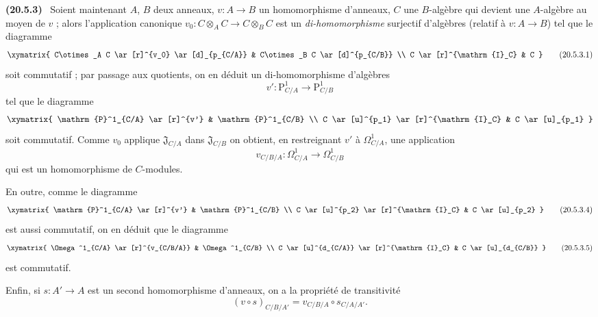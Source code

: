 \documentclass[10pt,oneside]{book}
\makeatletter
\newcommand{\setmanualcurrentlabel}[1]{\def\@currentlabel{#1}}
\newcommand{\oldpage}[2][]{%
  \setcounter{footnote}{0}%
  \marginpar{\scriptsize\textbf{#1}~|~#2}\ignorespaces}
\newenvironment{env}[1][]{\setmanualcurrentlabel{#1}\par\medskip\noindent\textbf{(#1)}\ }{\par}
\makeatother
\begin{document}
\begin{env}[20.5.3]
\label{0.20.5.3-fr}
Soient maintenant $A$, $B$ deux anneaux, $v:A\to B$ un homomorphisme
d'anneaux, $C$ une $B$-algèbre qui devient une $A$-algèbre au moyen de $v$ ;
alors l'application canonique $v_0:C\otimes_A C\to C\otimes_B C$ est un
\emph{di-homomorphisme} surjectif d'algèbres (relatif à $v:A\to B$) tel que
le diagramme
\[
\xymatrix{
  C\otimes_A C \ar[r]^{v_0} \ar[d]_{p_{C/A}} &
  C\otimes_B C \ar[d]^{p_{C/B}} \\
  C \ar[r]^{\mathrm{I}_C} & C
}
\tag{20.5.3.1}
\label{0.20.5.3.1-fr}
\]
soit commutatif ; par passage aux quotients, on en déduit un
di-homomorphisme d'algèbres
\begin{equation}
\tag{20.5.3.2}
\label{0.20.5.3.2-fr}
  v':\mathrm{P}^1_{C/A}\to\mathrm{P}^1_{C/B}
\end{equation}
tel que le diagramme
\[
\xymatrix{
  \mathrm{P}^1_{C/A} \ar[r]^{v'} & \mathrm{P}^1_{C/B} \\
  C \ar[u]^{p_1} \ar[r]^{\mathrm{I}_C} & C \ar[u]_{p_1}
}
\]
soit commutatif. Comme $v_0$ applique $\mathfrak{J}_{C/A}$ dans
$\mathfrak{J}_{C/B}$ on obtient, en restreignant $v'$ à
$\Omega^1_{C/A}$, une application
\begin{equation}
\tag{20.5.3.3}
\label{0.20.5.3.3-fr}
  v_{C/B/A}:\Omega^1_{C/A}\to\Omega^1_{C/B}
\end{equation}
qui est un homomorphisme de $C$-modules.

\oldpage[0\textsubscript{IV-1}]{130}
En outre, comme le diagramme
\[
\xymatrix{
  \mathrm{P}^1_{C/A} \ar[r]^{v'} & \mathrm{P}^1_{C/B} \\
  C \ar[u]^{p_2} \ar[r]^{\mathrm{I}_C} & C \ar[u]_{p_2}
}
\tag{20.5.3.4}
\label{0.20.5.3.4-fr}
\]
est aussi commutatif, on en déduit que le diagramme
\[
\xymatrix{
  \Omega^1_{C/A} \ar[r]^{v_{C/B/A}} & \Omega^1_{C/B} \\
  C \ar[u]^{d_{C/A}} \ar[r]^{\mathrm{I}_C} & C \ar[u]_{d_{C/B}}
}
\tag{20.5.3.5}
\label{0.20.5.3.5-fr}
\]
est commutatif.

Enfin, si $s:A'\to A$ est un second homomorphisme d'anneaux, on a la
propriété de transitivité
\begin{equation}
\tag{20.5.3.6}
\label{0.20.5.3.6-fr}
  (v\circ s)_{C/B/A'}=v_{C/B/A}\circ s_{C/A/A'}.
\end{equation}
\end{env}
\end{document}
